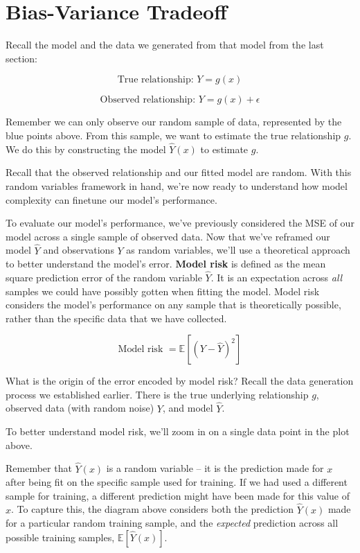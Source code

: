 \documentclass[
  letterpaper,
  DIV=11,
  numbers=noendperiod]{scrreprt}
\begin{document}
\hypertarget{bias-variance-tradeoff}{%
\section{Bias-Variance Tradeoff}\label{bias-variance-tradeoff}}

Recall the model and the data we generated from that model from the last
section:

\[\text{True relationship: }Y = g(x)\]

\[\text{Observed relationship: }Y = g(x) + \epsilon\]

Remember we can only observe our random sample of data, represented by
the blue points above. From this sample, we want to estimate the true
relationship \(g\). We do this by constructing the model \(\hat{Y}(x)\)
to estimate \(g\).

Recall that the observed relationship and our fitted model are random.
With this random variables framework in hand, we're now ready to
understand how model complexity can finetune our model's performance.

To evaluate our model's performance, we've previously considered the MSE
of our model across a single sample of observed data. Now that we've
reframed our model \(\hat{Y}\) and observations \(Y\) as random
variables, we'll use a theoretical approach to better understand the
model's error. \textbf{Model risk} is defined as the mean square
prediction error of the random variable \(\hat{Y}\). It is an
expectation across \emph{all} samples we could have possibly gotten when
fitting the model. Model risk considers the model's performance on any
sample that is theoretically possible, rather than the specific data
that we have collected.

\[\text{Model risk }=\mathbb{E}\left[(Y-\hat{Y})^2\right]\]

What is the origin of the error encoded by model risk? Recall the data
generation process we established earlier. There is the true underlying
relationship \(g\), observed data (with random noise) \(Y\), and model
\(\hat{Y}\).

To better understand model risk, we'll zoom in on a single data point in
the plot above.

Remember that \(\hat{Y}(x)\) is a random variable -- it is the
prediction made for \(x\) after being fit on the specific sample used
for training. If we had used a different sample for training, a
different prediction might have been made for this value of \(x\). To
capture this, the diagram above considers both the prediction
\(\hat{Y}(x)\) made for a particular random training sample, and the
\emph{expected} prediction across all possible training samples,
\(\mathbb{E}[\hat{Y}(x)]\).
\end{document}
